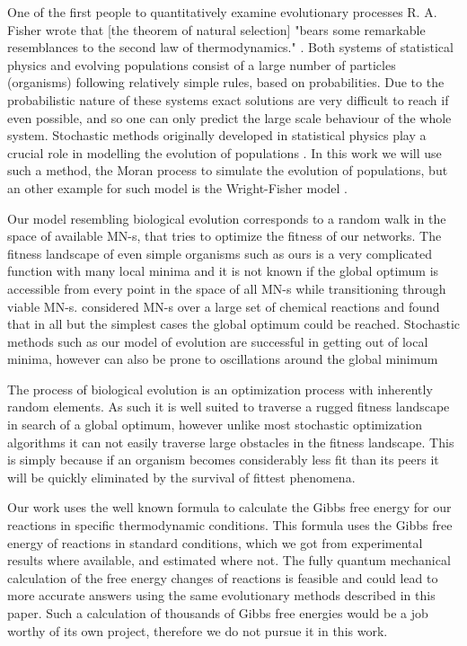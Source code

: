 \documentclass[a4paper,12pt]{article}
\begin{document}
	One of the first people to quantitatively examine evolutionary processes R. A. Fisher wrote that [the theorem of natural selection] "bears some remarkable resemblances to the second law of thermodynamics." \cite{fisherevolution}. Both systems of statistical physics and evolving populations consist of a large number of particles (organisms) following relatively simple rules, based on probabilities. Due to the probabilistic nature of these systems exact solutions are very difficult to reach if even possible, and so one can only predict the large scale behaviour of the whole system. Stochastic methods originally developed in statistical physics play a crucial role in modelling the evolution of populations \cite{stochasticblythe}. In this work we will use such a method, the Moran process \cite{moranprocess} to simulate the evolution of populations, but an other example for such model is the Wright-Fisher model \cite{mathematicalpopgen}.

	Our model resembling biological evolution corresponds to a random walk in the space of available MN-s, that tries to optimize the fitness of our networks. The fitness landscape of even simple organisms such as ours is a very complicated function with many local minima and it is not known if the global optimum is accessible from every point in the space of all MN-s while transitioning through viable MN-s. \cite{historical} considered MN-s over a large set of chemical reactions and found that in all but the simplest cases the global optimum could be reached. Stochastic methods such as our model of evolution are successful in getting out of local minima, however can also be prone to oscillations around the global minimum 

	The process of biological evolution is an optimization process with inherently random elements. As such it is well suited to traverse a rugged fitness landscape in search of a global optimum, however unlike most stochastic optimization algorithms it can not easily traverse large obstacles in the fitness landscape. This is simply because if an organism becomes considerably less fit than its peers it will be quickly eliminated by the survival of fittest phenomena.

	Our work uses the well known formula to calculate the Gibbs free energy for our reactions in specific thermodynamic conditions. This formula uses the Gibbs free energy of reactions in standard conditions, which we got from experimental results where available, and estimated \cite{BartekLower} where not. The fully quantum mechanical calculation of the free energy changes of reactions is feasible and could lead to more accurate answers using the same evolutionary methods described in this paper. Such a calculation of thousands of Gibbs free energies would be a job worthy of its own project, therefore we do not pursue it in this work. 
\end{document}
